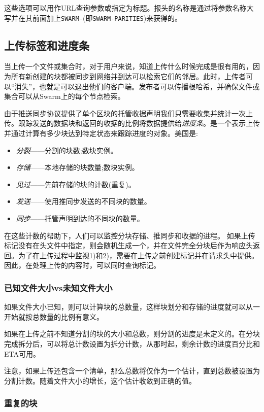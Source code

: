 这些选项可以用作URL查询参数或指定为标题。报头的名称是通过将参数名称大写并在其前面加上\lstinline{SWARM-}(即\lstinline{SWARM-PARITIES})来获得的。  


\subsection{上传标签和进度条\statusgreen}\label{sec:tags}
当上传一个文件或集合时，对于用户来说，知道上传什么时候完成是很有用的，因为所有新创建的块都被同步到网络并到达可以检索它们的邻居。此时，上传者可以“消失”，也就是可以退出他们的客户端。发布者可以传播根哈希，并确保文件或集合可以从Swarm上的每个节点检索。

由于推送同步协议提供了单个区块的托管收据声明我们只需要收集并统计一次上传。跟踪发送的数据块和返回的收据的比例将数据提供给\emph{进度条}。是一个表示上传并通过计算有多少块达到特定状态来跟踪进度的对象。美国是: 

\begin{itemize}
\item \emph{分裂}——分割的块数;数块实例。
\item \emph{存储}——本地存储的块数量;数块实例。
\item \emph{见过}——先前存储的块的计数(重复)。
\item \emph{发送}——使用推同步发送的不同块的数量。
\item \emph{同步}——托管声明到达的不同块的数量。
\end{itemize}

在这些计数的帮助下，人们可以监控分块存储、推同步和收据的进程。
如果上传标记没有在头文件中指定，则会随机生成一个，并在文件完全分块后作为响应头返回。为了在上传过程中监视1)和2)，需要在上传之前创建标记并在请求头中提供。因此，在处理上传的内容时，可以同时查询标记。 

\subsubsection{已知文件大小vs未知文件大小}

如果文件大小已知，则可以计算块的总数量，这样块划分和存储的进度就可以从一开始就按总数量的比例有意义。

如果在上传之前不知道分割的块的大小和总数，则分割的进度是未定义的。在分块完成拆分后，可以将总计数设置为拆分计数，从那时起，剩余计数的进度百分比和ETA可用。

注意，如果上传还包含一个清单，那么总数将仅作为一个估计，直到总数被设置为分割计数。随着文件大小的增长，这个估计收敛到正确的值。


\subsubsection{重复的块}

